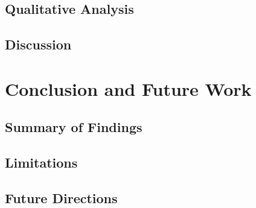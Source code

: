 \documentclass[sigconf]{acmart}
\begin{document}
\subsection{Qualitative Analysis}
\subsection{Discussion}

\section{Conclusion and Future Work}
\label{sec:conclusion}
\subsection{Summary of Findings}
\subsection{Limitations}
\subsection{Future Directions}

\begin{acks}
\end{acks}



\end{document}

